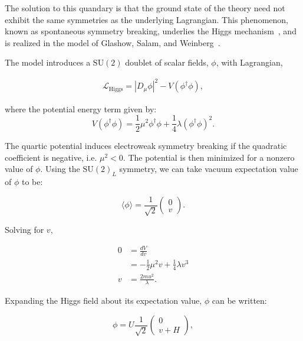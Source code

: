 The solution to this quandary is that the ground state of the theory need not exhibit the same symmetries as the underlying Lagrangian. This phenomenon, known as spontaneous symmetry breaking, underlies the Higgs mechanism~\cite{Higgs:1964pj,Englert:1964et,Guralnik:1964eu}, and is realized in the model of Glashow, Salam, and Weinberg~\cite{Glashow:1961tr,Weinberg:1967tq,Salam:1968rm}. 

The model introduces a $\mathrm{SU}(2)$ doublet of scalar fields, $\phi$, with Lagrangian,


\begin{equation}\label{eqn:higg-lagrangian}
	\begin{multlined}
		\mathcal{L}_{\mathrm{Higgs}} = |D_{\mu}\phi|^2 - V(\phi^{\dagger}\phi),
	\end{multlined}
\end{equation}

where the potential energy term given by:
\begin{equation}\label{eqn:higgs-potential}
	V(\phi^{\dagger}\phi) = \frac12 \mu^2 \phi^{\dagger}\phi + \frac14 \lambda (\phi^{\dagger}\phi)^2.
\end{equation}


The quartic potential induces electroweak symmetry breaking if the quadratic coefficient is negative, i.e. $\mu^2<0$. The potential is then minimized for a nonzero value of $\phi$. Using the $\mathrm{SU}(2)_L$ symmetry, we can take vacuum expectation value of $\phi$ to be:

\begin{equation}
	\langle \phi \rangle = \frac{1}{\sqrt{2}} \left(\begin{array}{c} 0 \\ v \end{array}\right).
\end{equation}
 
Solving for $v$,

\begin{align}
	0 &= \frac{dV}{dv}\\
	&= -\frac12\mu^2 v + \frac14\lambda v^3 \\
	v &= \frac{2mu^2}{\lambda}.
\end{align}

Expanding the Higgs field about its expectation value, $\phi$ can be written:

\begin{equation}
	\phi = U \frac{1}{\sqrt{2}} \left(\begin{array}{c} 0 \\ v+H \end{array}\right),
\end{equation}

